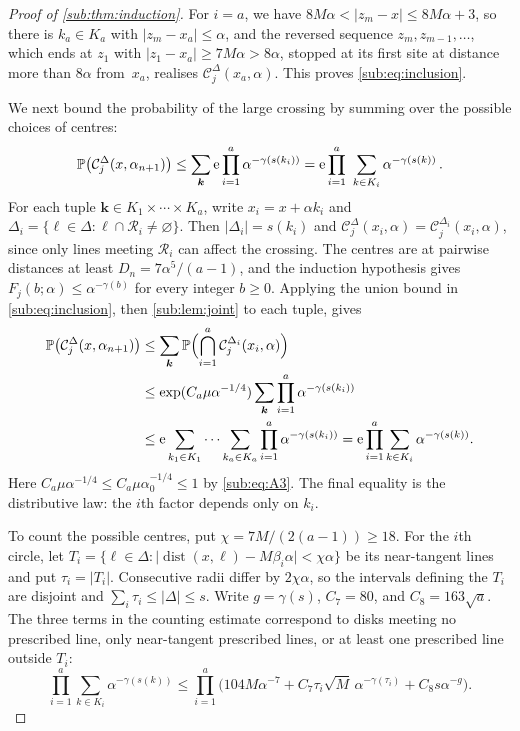 \documentclass[11pt,letterpaper]{article}
\DeclareMathOperator{\dist}{dist}
\newcommand{\cC}{\mathcal C}
\begin{document}
\begin{proof}[Proof of \cref{sub:thm:induction}]
For $i=a$, we have $8M\alpha<\lvert z_m-x\rvert\le8M\alpha+3$, so there is $k_a\in K_a$ with $\lvert z_m-x_a\rvert\le\alpha$, and the reversed sequence $z_m,z_{m-1},\dots$, which ends at $z_1$ with $\lvert z_1-x_a\rvert\ge7M\alpha>8\alpha$, stopped at its first site at distance more than $8\alpha$ from~$x_a$, realises $\cC_j^{\Delta}(x_a,\alpha)$. This proves \eqref{sub:eq:inclusion}.

We next bound the probability of the large crossing by summing over the possible choices of centres:
\begin{equation}\label{sub:eq:tuple-bound}
  \P\bigl(\cC_j^{\Delta}(x,\alpha_{n+1})\bigr)
    \le \sum_{\boldsymbol k}\e\prod_{i=1}^a\alpha^{-\gamma(s(k_i))}
     =\e\prod_{i=1}^a\ \sum_{k\in K_i}\alpha^{-\gamma(s(k))}\,.
\end{equation}
For each tuple $\boldsymbol k\in K_1\times\cdots\times K_a$, write $x_i=x+\alpha k_i$ and $\Delta_i=\{\ell\in\Delta:\ell\cap\mathcal R_i\ne\varnothing\}$. Then $\lvert\Delta_i\rvert=s(k_i)$ and $\cC_j^\Delta(x_i,\alpha)=\cC_j^{\Delta_i}(x_i,\alpha)$, since only lines meeting $\mathcal R_i$ can affect the crossing. The centres are at pairwise distances at least $D_n=7\alpha^5/(a-1)$, and the induction hypothesis gives $F_j(b;\alpha)\le\alpha^{-\gamma(b)}$ for every integer $b\ge0$. Applying the union bound in \eqref{sub:eq:inclusion}, then \cref{sub:lem:joint} to each tuple, gives
\begin{align*}
 \P\bigl(\cC_j^\Delta(x,\alpha_{n+1})\bigr)
 &\le \sum_{\boldsymbol k}
      \P\Bigl(\bigcap_{i=1}^a \cC_j^{\Delta_i}(x_i,\alpha)\Bigr)\\
 &\le \exp(C_a\mu\alpha^{-1/4})
      \sum_{\boldsymbol k}\prod_{i=1}^a\alpha^{-\gamma(s(k_i))}\\
 &\le \e\sum_{k_1\in K_1}\cdots\sum_{k_a\in K_a}
      \prod_{i=1}^a\alpha^{-\gamma(s(k_i))}
  = \e\prod_{i=1}^a\sum_{k\in K_i}\alpha^{-\gamma(s(k))}.
\end{align*}
Here $C_a\mu\alpha^{-1/4}\le C_a\mu\alpha_0^{-1/4}\le1$ by \eqref{sub:eq:A3}. The final equality is the distributive law: the $i$th factor depends only on $k_i$.

To count the possible centres, put $\chi=7M/(2(a-1))\ge18$. For the $i$th circle, let $T_i=\{\ell\in\Delta:\lvert\dist(x,\ell)-M\beta_i\alpha\rvert<\chi\alpha\}$ be its near-tangent lines and put $\tau_i=\lvert T_i\rvert$. Consecutive radii differ by $2\chi\alpha$, so the intervals defining the $T_i$ are disjoint and $\sum_i\tau_i\le\lvert\Delta\rvert\le s$. Write $g=\gamma(s)$, $C_7=80$, and $C_8=163\sqrt a$. The three terms in the counting estimate correspond to disks meeting no prescribed line, only near-tangent prescribed lines, or at least one prescribed line outside $T_i$:
\begin{equation}\label{sub:eq:counting-bound}
 \prod_{i=1}^a\sum_{k\in K_i}\alpha^{-\gamma(s(k))}
 \le \prod_{i=1}^a
   \bigl(104M\alpha^{-7}+C_7\tau_i\sqrt M\,\alpha^{-\gamma(\tau_i)}
                     +C_8s\alpha^{-g}\bigr).
\end{equation}


\end{proof}
\end{document}
